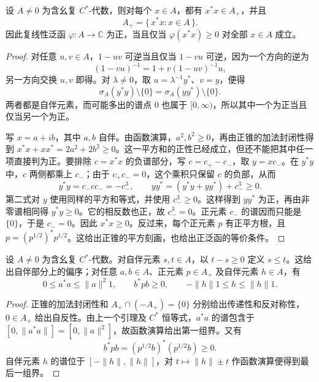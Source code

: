 \begin{lemma}[平方元素的正性]\label{b2:lem:cstar-square-positive}
	设 \(A\ne0\) 为含幺复 \(C^*\)-代数，则对每个 \(x\in A\)，都有 \(x^*x\in A_+\)，并且
	\[
		A_+=\{\,x^*x:x\in A\,\}.
	\]
	因此复线性泛函 \(\varphi:A\to\mathbb C\) 为正，当且仅当 \(\varphi(x^*x)\ge0\) 对全部 \(x\in A\) 成立。
\end{lemma}
\begin{proof}
	对任意 \(u,v\in A\)，\(1-uv\) 可逆当且仅当 \(1-vu\) 可逆，因为一个方向的逆为
	\[
		(1-vu)^{-1}=1+v(1-uv)^{-1}u,
	\]
	另一方向交换 \(u,v\) 即得。对 \(\lambda\ne0\)，取 \(u=\lambda^{-1}y^*\)、\(v=y\)，便得
	\[
		\sigma_A(y^*y)\setminus\{0\} =\sigma_A(yy^*)\setminus\{0\}.
	\]
	两者都是自伴元素，而可能多出的谱点 \(0\) 也属于 \([0,\infty)\)，所以其中一个为正当且仅当另一个为正。

	写 \(x=a+ib\)，其中 \(a,b\) 自伴。由函数演算，\(a^2,b^2\ge0\)，再由正锥的加法封闭性得到 \(x^*x+xx^*=2a^2+2b^2\ge0\)。这一平方和的正性已经成立，但还不能把其中任一项直接判为正。要排除 \(c=x^*x\) 的负谱部分，写 \(c=c_+-c_-\)，取 \(y=xc_-\)。在 \(y^*y\) 中，\(c\) 两侧都乘上 \(c_-\)；由于 \(c_+c_-=0\)，这个乘积只保留 \(c\) 的负部，从而
	\[
		y^*y=c_-cc_-=-c_-^3,\qquad yy^*=(y^*y+yy^*)+c_-^3\ge0.
	\]
	第二式对 \(y\) 使用同样的平方和等式，并使用 \(c_-^3\ge0\)。这样得到 \(yy^*\) 为正，再由非零谱相同得 \(y^*y\ge0\)。它的相反数也正，故 \(c_-^3=0\)。正元素 \(c_-\) 的谱因而只能是 \(\{0\}\)，于是 \(c_-=0\)。因此 \(x^*x\ge0\)。反过来，每个正元素 \(p\) 有正平方根，且 \(p=(p^{1/2})^*p^{1/2}\)。这给出正锥的平方刻画，也给出正泛函的等价条件。
\end{proof}

\begin{proposition}[正元素的次序性质]\label{b2:prop:cstar-positive-input}
	设 \(A\ne0\) 为含幺复 \(C^*\)-代数。对自伴元素 \(s,t\in A\)，以 \(t-s\ge0\) 定义 \(s\le t\)。这给出自伴部分上的偏序；对任意 \(a,b\in A\)、正元素 \(p\in A_+\) 及自伴元素 \(h\in A\)，有
	\[
		0\le a^*a\le\|a\|^2 1,\qquad b^*pb\ge0,\qquad -\|h\|1\le h\le\|h\|1.
	\]
\end{proposition}
\begin{proof}
	正锥的加法封闭性和 \(A_+\cap(-A_+)=\{0\}\) 分别给出传递性和反对称性，\(0\in A_+\) 给出自反性。由上一个引理及 \(C^*\) 恒等式，\(a^*a\) 的谱包含于 \([0,\|a^*a\|]=[0,\|a\|^2]\)，故函数演算给出第一组界。又有
	\[
		b^*pb=(p^{1/2}b)^*(p^{1/2}b)\ge0.
	\]
	自伴元素 \(h\) 的谱位于 \([-\|h\|,\|h\|]\)，对 \(t\mapsto\|h\|\pm t\) 作函数演算便得到最后一组界。
\end{proof}

